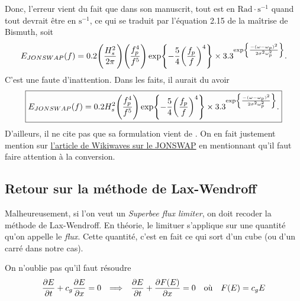 \documentclass[10pt]{article}
\numberwithin{equation}{section}
\newcommand{\venti}{\vphantom{\sum_x^x}}
\begin{document}
Donc, l'erreur vient du fait que dans son manuscrit, tout est en \(\mathrm{Rad}\cdot\mathrm{s}^{-1}\) quand tout devrait être en \(\mathrm{s}^{-1}\), ce qui se traduit par l'équation 2.15 de la maîtrise de Bismuth, soit
\begin{equation}
   E_{JONSWAP}(f) = 0.2\qty(\venti\frac{H_s^2}{2\pi}) \qty(\frac{f^4_p}{f^5}) \exp{-\frac{5}{4}\qty(\frac{f_p}{f})^4} \times 3.3^{\exp{\frac{-(\omega-\omega_p)^2}{2\sigma^2 \omega_p^2}}}.
\end{equation}
C'est une faute d'inattention. Dans les faits, il aurait du avoir
\begin{equation}
   \boxed{E_{JONSWAP}(f) = 0.2 \venti H_s^2 \qty(\frac{f^4_p}{f^5}) \exp{-\frac{5}{4}\qty(\frac{f_p}{f})^4} \times 3.3^{\exp{\frac{-(\omega-\omega_p)^2}{2\sigma^2 \omega_p^2}}}.}
\end{equation}
D'ailleurs, il ne cite pas que sa formulation vient de \Textcite{goda1988variablity}.
On en fait justement mention sur \href{https://wikiwaves.org/Ocean-Wave\_Spectra}{l'article de Wikiwaves sur le JONSWAP} en mentionnant qu'il faut faire attention à la conversion.
\subsection{Retour sur la méthode de Lax-Wendroff}
\label{sec:org60cc8dc}

Malheureusement, si l'on veut un \emph{Superbee flux limiter}, on doit recoder la méthode de Lax-Wendroff.
En théorie, le limituer s'applique sur une quantité qu'on appelle le \emph{flux}.
Cette quantité, c'est en fait ce qui sort d'un cube (ou d'un carré dans notre cas).\bigskip

On n'oublie pas qu'il faut résoudre
\begin{align}
   &&\pdv{E}{t} + c_g \pdv{E}{x} = 0 && \Longrightarrow &&   \pdv{E}{t} + \pdv{F(E)}{x}  = 0 \quad\text{où}\quad F(E) = c_gE &&
\end{align}
\end{document}
